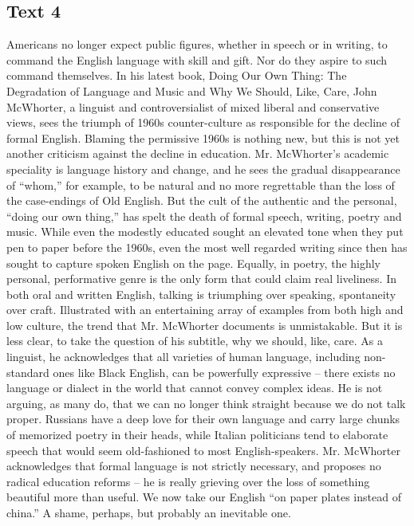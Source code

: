 \subsection{Text 4}
Americans no longer expect public figures, whether in speech or in writing, to command the English language with skill and gift. Nor do they aspire to such command themselves. In his latest book, Doing Our Own Thing: The Degradation of Language and Music and Why We Should, Like, Care, John McWhorter, a linguist and controversialist of mixed liberal and conservative views, sees the triumph of 1960s counter-culture as responsible for the decline of formal English.
Blaming the permissive 1960s is nothing new, but this is not yet another criticism against the decline in education. Mr. McWhorter’s academic speciality is language history and change, and he sees the gradual disappearance of “whom,” for example, to be natural and no more regrettable than the loss of the case-endings of Old English.
But the cult of the authentic and the personal, “doing our own thing,” has spelt the death of formal speech, writing, poetry and music. While even the modestly educated sought an elevated tone when they put pen to paper before the 1960s, even the most well regarded writing since then has sought to capture spoken English on the page. Equally, in poetry, the highly personal, performative genre is the only form that could claim real liveliness. In both oral and written English, talking is triumphing over speaking, spontaneity over craft.
Illustrated with an entertaining array of examples from both high and low culture, the trend that Mr. McWhorter documents is unmistakable. But it is less clear, to take the question of his subtitle, why we should, like, care. As a linguist, he acknowledges that all varieties of human language, including non-standard ones like Black English, can be powerfully expressive -- there exists no language or dialect in the world that cannot convey complex ideas. He is not arguing, as many do, that we can no longer think straight because we do not talk proper.
Russians have a deep love for their own language and carry large chunks of memorized poetry in their heads, while Italian politicians tend to elaborate speech that would seem old-fashioned to most English-speakers. Mr. McWhorter acknowledges that formal language is not strictly necessary, and proposes no radical education reforms -- he is really grieving over the loss of something beautiful more than useful. We now take our English “on paper plates instead of china.” A shame, perhaps, but probably an inevitable one.
